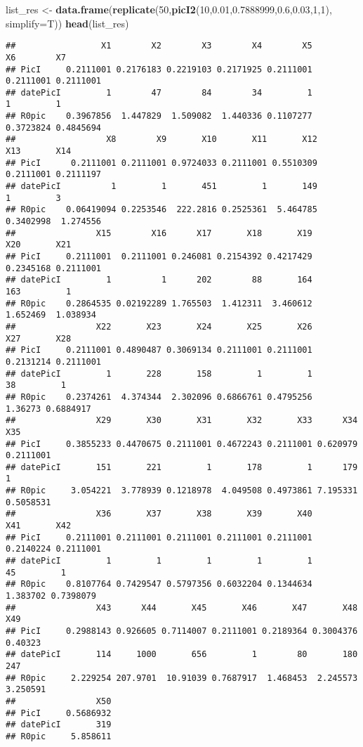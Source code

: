 \documentclass[
]{article}
\newenvironment{Shaded}{\begin{snugshade}}{\end{snugshade}}
\newcommand{\DataTypeTok}[1]{\textcolor[rgb]{0.13,0.29,0.53}{#1}}
\newcommand{\DecValTok}[1]{\textcolor[rgb]{0.00,0.00,0.81}{#1}}
\newcommand{\FloatTok}[1]{\textcolor[rgb]{0.00,0.00,0.81}{#1}}
\newcommand{\KeywordTok}[1]{\textcolor[rgb]{0.13,0.29,0.53}{\textbf{#1}}}
\newcommand{\NormalTok}[1]{#1}
\newcommand{\StringTok}[1]{\textcolor[rgb]{0.31,0.60,0.02}{#1}}
\begin{document}
\begin{Shaded}
\begin{Highlighting}[]
\NormalTok{list_res <-}\StringTok{ }\KeywordTok{data.frame}\NormalTok{(}\KeywordTok{replicate}\NormalTok{(}\DecValTok{50}\NormalTok{,}\KeywordTok{picI2}\NormalTok{(}\DecValTok{10}\NormalTok{,}\FloatTok{0.01}\NormalTok{,}\FloatTok{0.7888999}\NormalTok{,}\FloatTok{0.6}\NormalTok{,}\FloatTok{0.03}\NormalTok{,}\DecValTok{1}\NormalTok{,}\DecValTok{1}\NormalTok{), }\DataTypeTok{simplify=}\NormalTok{T))}
\KeywordTok{head}\NormalTok{(list_res)}
\end{Highlighting}
\end{Shaded}

\begin{verbatim}
##                 X1        X2        X3        X4        X5        X6        X7
## PicI     0.2111001 0.2176183 0.2219103 0.2171925 0.2111001 0.2111001 0.2111001
## datePicI         1        47        84        34         1         1         1
## R0pic    0.3967856  1.447829  1.509082  1.440336 0.1107277 0.3723824 0.4845694
##                  X8        X9       X10       X11       X12       X13       X14
## PicI      0.2111001 0.2111001 0.9724033 0.2111001 0.5510309 0.2111001 0.2111197
## datePicI          1         1       451         1       149         1         3
## R0pic    0.06419094 0.2253546  222.2816 0.2525361  5.464785 0.3402998  1.274556
##                X15        X16      X17       X18       X19       X20       X21
## PicI     0.2111001  0.2111001 0.246081 0.2154392 0.4217429 0.2345168 0.2111001
## datePicI         1          1      202        88       164       163         1
## R0pic    0.2864535 0.02192289 1.765503  1.412311  3.460612  1.652469  1.038934
##                X22       X23       X24       X25       X26       X27       X28
## PicI     0.2111001 0.4890487 0.3069134 0.2111001 0.2111001 0.2131214 0.2111001
## datePicI         1       228       158         1         1        38         1
## R0pic    0.2374261  4.374344  2.302096 0.6866761 0.4795256   1.36273 0.6884917
##                X29       X30       X31       X32       X33      X34       X35
## PicI     0.3855233 0.4470675 0.2111001 0.4672243 0.2111001 0.620979 0.2111001
## datePicI       151       221         1       178         1      179         1
## R0pic     3.054221  3.778939 0.1218978  4.049508 0.4973861 7.195331 0.5058531
##                X36       X37       X38       X39       X40       X41       X42
## PicI     0.2111001 0.2111001 0.2111001 0.2111001 0.2111001 0.2140224 0.2111001
## datePicI         1         1         1         1         1        45         1
## R0pic    0.8107764 0.7429547 0.5797356 0.6032204 0.1344634  1.383702 0.7398079
##                X43      X44       X45       X46       X47       X48      X49
## PicI     0.2988143 0.926605 0.7114007 0.2111001 0.2189364 0.3004376  0.40323
## datePicI       114     1000       656         1        80       180      247
## R0pic     2.229254 207.9701  10.91039 0.7687917  1.468453  2.245573 3.250591
##                X50
## PicI     0.5686932
## datePicI       319
## R0pic     5.858611
\end{verbatim}
\end{document}
